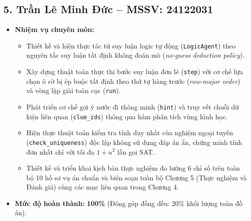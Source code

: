 \subsection*{5. Trần Lê Minh Đức -- MSSV: 24122031}
\begin{itemize}
    \item \textbf{Nhiệm vụ chuyên môn:}
    \begin{itemize}
        \item Thiết kế và hiện thực tác tử suy luận logic tự động (\texttt{LogicAgent}) theo nguyên tắc suy luận tất định không đoán mò (\textit{no-guess deduction policy}).
        \item Xây dựng thuật toán thực thi bước suy luận đơn lẻ (\texttt{step}) với cơ chế lựa chọn ô cờ bị ép buộc tất định theo thứ tự hàng trước (\textit{row-major order}) và vòng lặp giải toàn cục (\texttt{run}).
        \item Phát triển cơ chế gợi ý nước đi thông minh (\texttt{hint}) và truy vết chuỗi dữ kiện liên quan (\texttt{clue\_ids}) thông qua hàm phân tích vùng hình học.
        \item Hiện thực thuật toán kiểm tra tính duy nhất của nghiệm ngoại tuyến (\texttt{check\_uniqueness}) độc lập không sử dụng đáp án ẩn, chứng minh tính đơn nhất chỉ với tối đa $1 + n^2$ lần gọi SAT.
        \item Thiết kế và triển khai kịch bản thực nghiệm đo lường 6 chỉ số trên toàn bộ 10 hồ sơ vụ án chuẩn và biên soạn toàn bộ Chương 5 (Thực nghiệm và Đánh giá) cùng các mục liên quan trong Chương 4.
    \end{itemize}
    \item \textbf{Mức độ hoàn thành:} \textbf{100\%} (Đóng góp đồng đều: 20\% khối lượng toàn đồ án).
\end{itemize}
